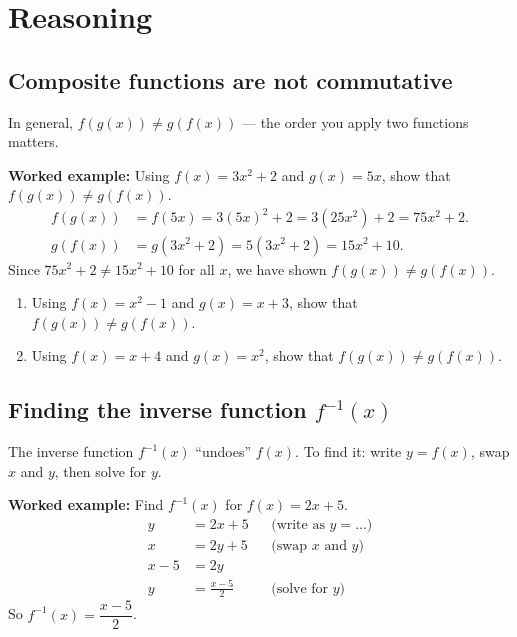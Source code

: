 \documentclass[11pt]{article}
\newcommand{\ans}{\hrulefill}
\newcommand{\anshere}{\par\vspace{0.3em}\noindent\ans\par\vspace{0.3em}}
\begin{document}
\newpage

\section*{Reasoning}

\subsection*{Composite functions are not commutative}
\noindent In general, $f(g(x)) \ne g(f(x))$ --- the order you apply two functions matters.

\vspace{0.3em}
\noindent\textbf{Worked example:} Using $f(x)=3x^2+2$ and $g(x)=5x$, show that
$f(g(x)) \ne g(f(x))$.
\begin{align*}
  f(g(x)) &= f(5x) = 3(5x)^2+2 = 3(25x^2)+2 = 75x^2+2. \\
  g(f(x)) &= g(3x^2+2) = 5(3x^2+2) = 15x^2+10.
\end{align*}
Since $75x^2+2 \ne 15x^2+10$ for all $x$, we have shown $f(g(x)) \ne g(f(x))$.

\vspace{0.4em}
\begin{enumerate}[label=(\alph*)]
  \item Using $f(x) = x^2-1$ and $g(x) = x+3$, show that $f(g(x)) \ne g(f(x))$.
  \anshere
  \item Using $f(x) = x+4$ and $g(x) = x^2$, show that $f(g(x)) \ne g(f(x))$.
  \anshere
\end{enumerate}

\vspace{0.6em}
\subsection*{Finding the inverse function $f^{-1}(x)$}
\noindent The inverse function $f^{-1}(x)$ ``undoes'' $f(x)$. To find it: write $y=f(x)$, swap
$x$ and $y$, then solve for $y$.

\vspace{0.3em}
\noindent\textbf{Worked example:} Find $f^{-1}(x)$ for $f(x) = 2x+5$.
\begin{align*}
  y &= 2x+5 & &\text{(write as $y=\ldots$)}\\
  x &= 2y+5 & &\text{(swap $x$ and $y$)}\\
  x-5 &= 2y \\
  y &= \frac{x-5}{2} & &\text{(solve for $y$)}
\end{align*}
So $f^{-1}(x) = \dfrac{x-5}{2}$.
\end{document}
